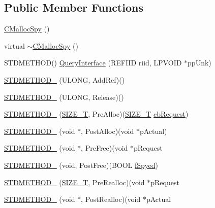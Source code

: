 \subsection*{Public Member Functions}
\begin{DoxyCompactItemize}
\item 
\hyperlink{class_c_malloc_spy_acee097e880c63f9c9d7a0fab848d01ad}{C\-Malloc\-Spy} ()
\item 
virtual \hyperlink{class_c_malloc_spy_a332b39325f3d919b780dcf9f6c4b0e7b}{$\sim$\-C\-Malloc\-Spy} ()
\item 
S\-T\-D\-M\-E\-T\-H\-O\-D() \hyperlink{class_c_malloc_spy_a7673b11a7b382f9c4a415884ad889cc3}{Query\-Interface} (R\-E\-F\-I\-I\-D riid, L\-P\-V\-O\-I\-D $\ast$pp\-Unk)
\item 
\hyperlink{class_c_malloc_spy_a56ef4aadda6b0e8c831f42526e31c49e}{S\-T\-D\-M\-E\-T\-H\-O\-D\-\_\-} (U\-L\-O\-N\-G, Add\-Ref)()
\item 
\hyperlink{class_c_malloc_spy_ae89ee06126bc811a341fb69f54ec87c4}{S\-T\-D\-M\-E\-T\-H\-O\-D\-\_\-} (U\-L\-O\-N\-G, Release)()
\item 
\hyperlink{class_c_malloc_spy_acdd95ee51bf7d8c6f8b213454fed8904}{S\-T\-D\-M\-E\-T\-H\-O\-D\-\_\-} (\hyperlink{_stack_walker_8h_abf8e46e57d5b85295601cefa33de3b7a}{S\-I\-Z\-E\-\_\-\-T}, Pre\-Alloc)(\hyperlink{_stack_walker_8h_abf8e46e57d5b85295601cefa33de3b7a}{S\-I\-Z\-E\-\_\-\-T} \hyperlink{class_c_malloc_spy_aaf02555ced89a6f90d0f2ea89408d5bd}{cb\-Request})
\item 
\hyperlink{class_c_malloc_spy_af137316917924f640bc6ecd1f992e718}{S\-T\-D\-M\-E\-T\-H\-O\-D\-\_\-} (void $\ast$, Post\-Alloc)(void $\ast$p\-Actual)
\item 
\hyperlink{class_c_malloc_spy_ae0b0ff669baa43d1c67f9e194f270f11}{S\-T\-D\-M\-E\-T\-H\-O\-D\-\_\-} (void $\ast$, Pre\-Free)(void $\ast$p\-Request
\item 
\hyperlink{class_c_malloc_spy_a470902acd09ddfc6ba1eea99e7301e98}{S\-T\-D\-M\-E\-T\-H\-O\-D\-\_\-} (void, Post\-Free)(B\-O\-O\-L \hyperlink{class_c_malloc_spy_a6409ca9d853418aaa52df69f44e131d9}{f\-Spyed})
\item 
\hyperlink{class_c_malloc_spy_a15e0fa366924cf95b79580096b4865dd}{S\-T\-D\-M\-E\-T\-H\-O\-D\-\_\-} (\hyperlink{_stack_walker_8h_abf8e46e57d5b85295601cefa33de3b7a}{S\-I\-Z\-E\-\_\-\-T}, Pre\-Realloc)(void $\ast$p\-Request
\item 
\hyperlink{class_c_malloc_spy_aab6a17a223fa8ce6afd857b626b2c99e}{S\-T\-D\-M\-E\-T\-H\-O\-D\-\_\-} (void $\ast$, Post\-Realloc)(void $\ast$p\-Actual

\end{DoxyCompactItemize}
